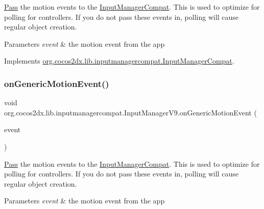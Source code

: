 \hyperlink{classPass}{Pass} the motion events to the \hyperlink{interfaceorg_1_1cocos2dx_1_1lib_1_1inputmanagercompat_1_1InputManagerCompat}{Input\+Manager\+Compat}. This is used to optimize for polling for controllers. If you do not pass these events in, polling will cause regular object creation.


\begin{DoxyParams}{Parameters}
{\em event} & the motion event from the app \\
\hline
\end{DoxyParams}


Implements \hyperlink{interfaceorg_1_1cocos2dx_1_1lib_1_1inputmanagercompat_1_1InputManagerCompat_a813a0308659d716c9503d44ccb48ebb1}{org.\+cocos2dx.\+lib.\+inputmanagercompat.\+Input\+Manager\+Compat}.

\mbox{\label{classorg_1_1cocos2dx_1_1lib_1_1inputmanagercompat_1_1InputManagerV9_aa7e7451896e351e520f511388907fde9}} 
\subsubsection{\texorpdfstring{on\+Generic\+Motion\+Event()}{onGenericMotionEvent()}\hspace{0.1cm}{\footnotesize\ttfamily [2/2]}}
{\footnotesize\ttfamily void org.\+cocos2dx.\+lib.\+inputmanagercompat.\+Input\+Manager\+V9.\+on\+Generic\+Motion\+Event (\begin{DoxyParamCaption}\item[{Motion\+Event}]{event }\end{DoxyParamCaption})\hspace{0.3cm}{\ttfamily [inline]}}

\hyperlink{classPass}{Pass} the motion events to the \hyperlink{interfaceorg_1_1cocos2dx_1_1lib_1_1inputmanagercompat_1_1InputManagerCompat}{Input\+Manager\+Compat}. This is used to optimize for polling for controllers. If you do not pass these events in, polling will cause regular object creation.


\begin{DoxyParams}{Parameters}
{\em event} & the motion event from the app \\
\hline
\end{DoxyParams}


